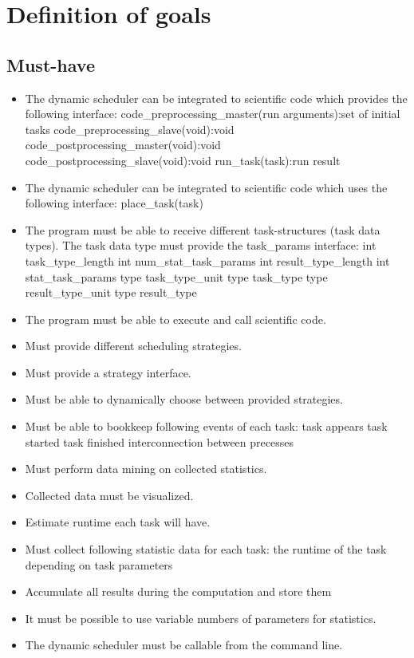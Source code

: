 \section{Definition of goals}
	\subsection{Must-have}
		\begin{itemize}
			\item The dynamic scheduler can be integrated to scientific code which provides the following interface:
				\subitem code\_preprocessing\_master(run arguments):set of initial tasks
				\subitem code\_preprocessing\_slave(void):void
				\subitem code\_postprocessing\_master(void):void
				\subitem code\_postprocessing\_slave(void):void
				\subitem run\_task(task):run result
			\item The dynamic scheduler can be integrated to scientific code which uses the following interface:
				\subitem place\_task(task)
			\item The program must be able to receive different task-structures (task data types). The task data type must provide the task\_params interface:
				\subitem int task\_type\_length
				\subitem int num\_stat\_task\_params
				\subitem int result\_type\_length
				\subitem int stat\_task\_params
				\subitem type task\_type\_unit
				\subitem type task\_type
				\subitem type result\_type\_unit
				\subitem type result\_type
				
			\item The program must be able to execute and call scientific code.
			\item Must provide different scheduling strategies.
			\item Must provide a strategy interface.
			\item Must be able to dynamically choose between provided strategies.
			\item Must be able to bookkeep following events of each task:
				\subitem task appears
				\subitem task started
				\subitem task finished
				\subitem interconnection between precesses
			\item Must perform data mining on collected statistics.
			\item Collected data must be visualized.
			\item Estimate runtime each task will have.
			\item Must collect following statistic data for each task:
				\subitem the runtime of the task depending on task parameters
			\item Accumulate all results during the computation and store them
			\item It must be possible to use variable numbers of parameters for statistics.
			\item The dynamic scheduler must be callable from the command line.
		\end{itemize}
